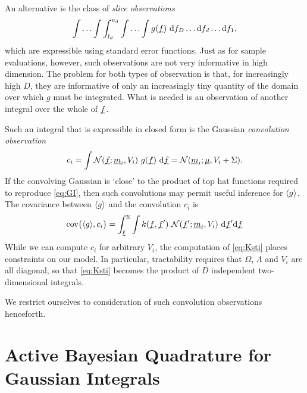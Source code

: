 \documentclass[twoside]{article}
\begin{document}
An alternative is the class of \emph{slice observations}
\begin{equation}
 \int \ldots \int \int_{l_d}^{u_d} \int \ldots \int g(\underline{\smash{f}})~\mathrm{d} f_D \ldots \mathrm{d} f_d\ldots \mathrm{d} f_1,
\end{equation}
which are expressible using standard error functions. Just as for sample evaluations, however, such observations are not very informative in high dimension. The problem for both types of observation is that, for increasingly high $D$, they are informative of only an increasingly tiny quantity of the domain over which $g$ must be integrated. What is needed is an observation of another integral over the whole of $\underline{\smash{f}}$.

Such an integral that is expressible in closed form is the Gaussian \emph{convolution observation}
 \begin{equation}\label{eq:conv}
 c_i = \int \mathcal{N}(\underline{\smash{f}};\underline{\smash{m}}_i,V_i)~g(\underline{\smash{f}})~\mathrm{d} \underline{\smash{f}} = \mathcal{N}(\underline{\smash{m}}_i;\underline{\smash{\mu}},V_i+\Sigma).
\end{equation}
 If the convolving Gaussian is `close' to the product of top hat functions required to reproduce \eqref{eq:GI}, then such convolutions may permit useful inference for $\langle g \rangle$. The covariance between $\langle g \rangle$ and the convolution $c_i$ is
\begin{align}\label{eq:Ksti}
\text{cov}\bigl(\langle g \rangle, c_i\bigr) =
\int_{\underline{\smash{\ell}}}^{\underline{\smash{u}}} \int  k(\underline{\smash{f}}, \underline{\smash{f}}')~\mathcal{N}(\underline{\smash{f}}';\underline{\smash{m}}_i,V_i)~\mathrm{d} \underline{\smash{f}}' \mathrm{d} \underline{\smash{f}} 
\end{align}
While we can compute $c_i$ for arbitrary $V_i$, the computation of \eqref{eq:Ksti} places constraints on our model. In particular, tractability requires that $\Omega$, $\Lambda$ and $V_i$ are all diagonal, so that \eqref{eq:Ksti} becomes the product of $D$ independent two-dimensional integrals.

We restrict ourselves to consideration of such convolution observations henceforth.


\section{Active Bayesian Quadrature for Gaussian Integrals}





\end{document}
